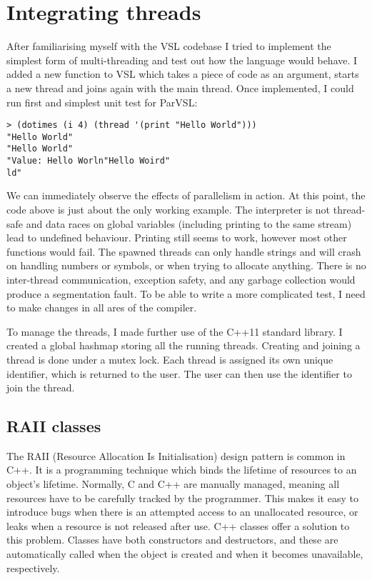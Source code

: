 \section{Integrating threads}
\label{sec:babythreads}
After familiarising myself with the VSL codebase I tried to implement the simplest form of
multi-threading and test out how the language would behave. I added a new function to VSL
which takes a piece of code as an argument, starts a new thread and joins again with
the main thread. Once implemented, I could run first and simplest unit test for ParVSL:

\begin{verbatim}
> (dotimes (i 4) (thread '(print "Hello World")))
"Hello World"
"Hello World"
"Value: Hello Worln"Hello Woird"
ld"
\end{verbatim}

We can immediately observe the effects of parallelism in action. At this point, the code above
is just about the only working example. The interpreter is not thread-safe and data races
on global variables (including printing to the same stream) lead to undefined behaviour. Printing
still seems to work, however most other functions would fail. The spawned threads can only handle strings
and will crash on handling numbers or symbols, or when trying to allocate anything.
There is no inter-thread communication, exception safety, and any garbage collection would produce a segmentation
fault. To be able to write a more complicated test, I need to make changes in all ares of the compiler.

To manage the threads, I made further use of the C++11 standard library. I created a global hashmap storing
all the running threads. Creating and joining a thread is done under a mutex lock. Each thread is assigned its own unique
identifier, which is returned to the user. The user can then use the identifier to join the thread.

\subsection{RAII classes}
\label{sec:raii}
The RAII (Resource Allocation Is Initialisation) design pattern is common in C++. It is a programming
technique which binds the lifetime of resources to an object's lifetime. Normally,
C and C++ are manually managed, meaning all resources have to be carefully tracked by the programmer.
This makes it easy to introduce bugs when there is an attempted access to an unallocated resource,
or leaks when a resource is not released after use. C++ classes offer a solution to this problem.
Classes have both constructors and destructors, and these are automatically called when the object
is created and when it becomes unavailable, respectively.

